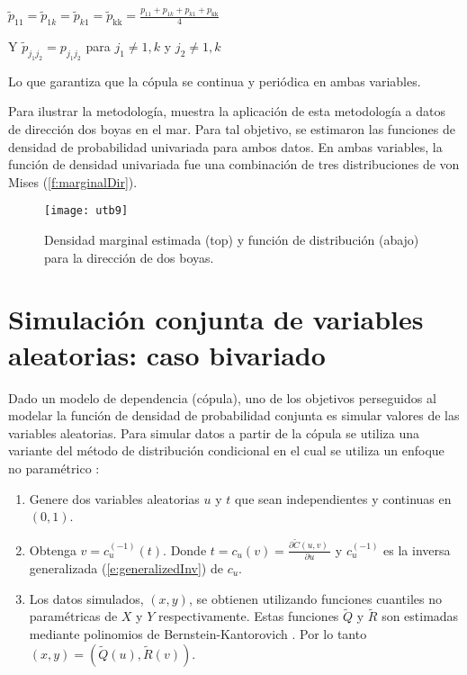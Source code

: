 \({\tilde{p}}_{11} = {\tilde{p}}_{1k} = {\tilde{p}}_{k1} = {\tilde{p}}_{\text{kk}} = \frac{p_{11} + p_{1k} + p_{k1} + p_{\text{kk}}}{4}\)

Y \({\tilde{p}}_{j_{1}j_{2}} = p_{j_{1}j_{2}}\) para \(j_{1} \neq 1,k\)
y \(j_{2} \neq 1,k\) 

Lo que garantiza que la c\'opula se continua y peri\'odica en ambas variables.

Para ilustrar la metodolog\'ia, \cite{carnicero_non-parametric_2013} muestra la aplicaci\'on de esta metodolog\'ia a datos de direcci\'on dos boyas en el mar. Para tal objetivo, se estimaron las funciones de densidad de probabilidad univariada para ambos datos. En ambas variables, la funci\'on de densidad univariada fue una combinaci\'on de tres distribuciones de von Mises (\autoref{f:marginalDir}).

\begin{figure}[H]
	\centering
\texttt{[image: utb9]}
	\caption{Densidad marginal estimada (top) y funci\'on de distribuci\'on (abajo) para la direcci\'on de dos boyas.}
	\label{f:marginalDir}
\end{figure}

\section{Simulaci\'on conjunta de variables aleatorias: caso bivariado}\label{s:simAlg2D}

Dado un modelo de dependencia (c\'opula), uno de los objetivos perseguidos al modelar la funci\'on de densidad de probabilidad conjunta es simular valores de las variables aleatorias.
Para simular datos a partir de la c\'opula se utiliza una variante del m\'etodo de distribuci\'on condicional \citep{nelsen_introduction_2006} en el cual se utiliza un enfoque no param\'etrico \citep{erdely_nonparametric_2009,erdely_joint_2012}:

\begin{enumerate}
\item
  Genere dos variables aleatorias \(u\) y \(t\) que sean independientes   y continuas en \(\left( 0,1 \right)\).
\item
  Obtenga \(v = c_{u}^{\left( - 1 \right)}\left( t \right)\). Donde
  \(t = c_{u}\left( v \right) = \frac{\partial\tilde{C}\left( u,v \right)\ }{\partial u}\)
  y \(c_{u}^{\left( - 1 \right)}\) es la inversa generalizada (\autoref{e:generalizedInv}) de \(c_{u}\).
\item
	Los datos simulados, \(\left( x,y \right)\), se obtienen utilizando   funciones cuantiles no param\'etricas de \(X\) y \(Y\) respectivamente.   Estas funciones \(\tilde{Q}\) y \(\tilde{R}\) son estimadas mediante   polinomios de Bernstein-Kantorovich \citep{munoz-perez_estimating_1987}. Por lo tanto   \(\left( x,y \right) = \left( \tilde{Q}\left( u \right),\tilde{R}\left( v \right) \right)\).
\end{enumerate}

